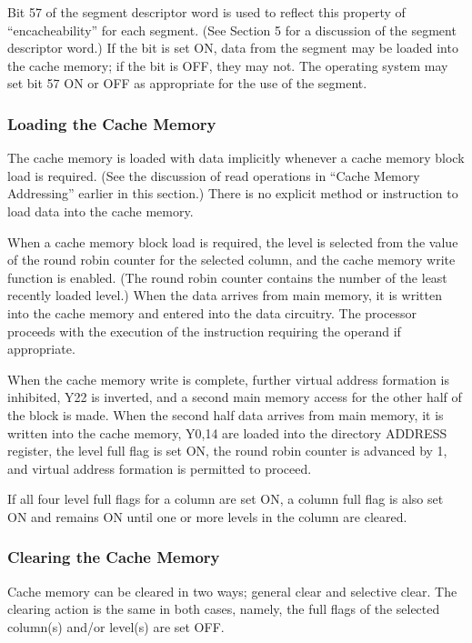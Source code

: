 Bit 57 of the segment descriptor word is used to reflect this property of
{``}encacheability'' for each segment. (See Section 5 for a discussion of the
segment descriptor word.) If the bit is set ON, data from the segment may be
loaded into the cache memory; if the bit is OFF, they may not.  The operating
system may set bit 57 ON or OFF as appropriate for the use of the segment.  


\subsubsection{Loading the Cache Memory}

The cache memory is loaded with data implicitly whenever a cache memory block
load is required. (See the discussion of read operations in {``}Cache Memory
Addressing'' earlier in this section.) There is no explicit method or
instruction to load data into the cache memory.  

When a cache memory block load is required, the level is selected from the
value of the round robin counter for the selected column, and the cache memory
write function is enabled.  (The round robin counter contains the number of the
least recently loaded level.) When the data arrives from main memory, it is
written into the cache memory and entered into the data circuitry.  The
processor proceeds with the execution of the instruction requiring the operand
if appropriate.  

When the cache memory write is complete, further virtual address formation is
inhibited, Y22 is inverted, and a second main memory access for the other half
of the block is made. When the second half data arrives from main memory, it is
written into the cache memory, Y0,14 are loaded into the directory ADDRESS
register, the level full flag is set ON, the round robin counter is advanced by
1, and virtual address formation is permitted to proceed.  

If all four level full flags for a column are set ON, a column full flag is
also set ON and remains ON until one or more levels in the column are cleared.

\subsubsection{Clearing the Cache Memory}

Cache memory can be cleared in two ways; general clear and selective clear. The
clearing action is the same in both cases, namely, the full flags of the
selected column(s) and/or level(s) are set OFF.


